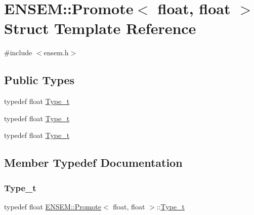\hypertarget{structENSEM_1_1Promote_3_01float_00_01float_01_4}{}\section{E\+N\+S\+EM\+:\+:Promote$<$ float, float $>$ Struct Template Reference}
\label{structENSEM_1_1Promote_3_01float_00_01float_01_4}


{\ttfamily \#include $<$ensem.\+h$>$}

\subsection*{Public Types}
\begin{DoxyCompactItemize}
\item 
typedef float \mbox{\hyperlink{structENSEM_1_1Promote_3_01float_00_01float_01_4_a27610700459f91acb939a75fd84c4d76}{Type\+\_\+t}}
\item 
typedef float \mbox{\hyperlink{structENSEM_1_1Promote_3_01float_00_01float_01_4_a27610700459f91acb939a75fd84c4d76}{Type\+\_\+t}}
\item 
typedef float \mbox{\hyperlink{structENSEM_1_1Promote_3_01float_00_01float_01_4_a27610700459f91acb939a75fd84c4d76}{Type\+\_\+t}}
\end{DoxyCompactItemize}


\subsection{Member Typedef Documentation}
\mbox{\label{structENSEM_1_1Promote_3_01float_00_01float_01_4_a27610700459f91acb939a75fd84c4d76}} 
\subsubsection{\texorpdfstring{Type\_t}{Type\_t}\hspace{0.1cm}{\footnotesize\ttfamily [1/3]}}
{\footnotesize\ttfamily typedef float \mbox{\hyperlink{structENSEM_1_1Promote}{E\+N\+S\+E\+M\+::\+Promote}}$<$ float, float $>$\+::\mbox{\hyperlink{structENSEM_1_1Promote_3_01float_00_01float_01_4_a27610700459f91acb939a75fd84c4d76}{Type\+\_\+t}}}

